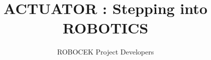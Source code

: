 \documentclass{tufte-book} %
\title{ACTUATOR : Stepping into ROBOTICS} %
\author{ROBOCEK Project Developers} %
\begin{document}
\frontmatter

\maketitle %




\let\cleardoublepage\clearpage 

\begin{spacing}{0.80}
    \tableofcontents %
\end{spacing}

\let\cleardoublepage\clearpage 

\listoffigures
\listoftables
\newpage
\printacronyms
\newpage



\mainmatter




\end{document}
